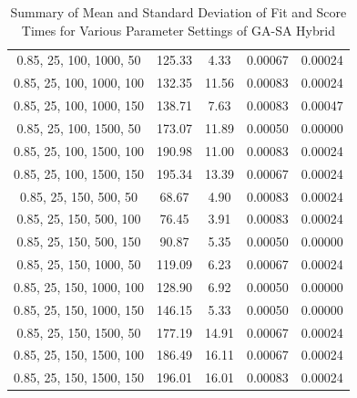 \documentclass[
]{article}
\begin{document}
\begin{table}[H]
{\begin{tabular}{|c|c|c|c|c|}
                0.85, 25, 100, 1000, 50    & 125.33                 & 4.33                  & 0.00067                  & 0.00024                 \\
                0.85, 25, 100, 1000, 100   & 132.35                 & 11.56                 & 0.00083                  & 0.00024                 \\
                0.85, 25, 100, 1000, 150   & 138.71                 & 7.63                  & 0.00083                  & 0.00047                 \\
                0.85, 25, 100, 1500, 50    & 173.07                 & 11.89                 & 0.00050                  & 0.00000                 \\
                0.85, 25, 100, 1500, 100   & 190.98                 & 11.00                 & 0.00083                  & 0.00024                 \\
                0.85, 25, 100, 1500, 150   & 195.34                 & 13.39                 & 0.00067                  & 0.00024                 \\
                0.85, 25, 150, 500, 50     & 68.67                  & 4.90                  & 0.00083                  & 0.00024                 \\
                0.85, 25, 150, 500, 100    & 76.45                  & 3.91                  & 0.00083                  & 0.00024                 \\
                0.85, 25, 150, 500, 150    & 90.87                  & 5.35                  & 0.00050                  & 0.00000                 \\
                0.85, 25, 150, 1000, 50    & 119.09                 & 6.23                  & 0.00067                  & 0.00024                 \\
                0.85, 25, 150, 1000, 100   & 128.90                 & 6.92                  & 0.00050                  & 0.00000                 \\
                0.85, 25, 150, 1000, 150   & 146.15                 & 5.33                  & 0.00050                  & 0.00000                 \\
                0.85, 25, 150, 1500, 50    & 177.19                 & 14.91                 & 0.00067                  & 0.00024                 \\
                0.85, 25, 150, 1500, 100   & 186.49                 & 16.11                 & 0.00067                  & 0.00024                 \\
                0.85, 25, 150, 1500, 150   & 196.01                 & 16.01                 & 0.00083                  & 0.00024                 \\
                \hline
            \end{tabular}
        }
        \caption{Summary of Mean and Standard Deviation of Fit and Score Times for Various Parameter Settings of GA-SA Hybrid}
        \label{tab:gasa_summary_fit_score_times}
    \end{table}
\end{document}
